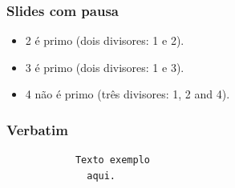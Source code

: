 \documentclass{beamer}
\begin{document}
	\begin{frame}
		\frametitle{Slides com pausa}
		\begin{itemize}
			\item 2 é primo (dois divisores: 1 e 2).
			\pause
			\item 3 é primo (dois divisores: 1 e 3).
			\pause
			\item 4 não é primo ({\color{red}três} divisores: 1, 2 and 4). 
		\end{itemize}
	\end{frame}
	
	\begin{frame}[fragile]
		\frametitle{Verbatim}
		\begin{verbatim}
			Texto exemplo
			  aqui.
		\end{verbatim}
	\end{frame}
	
\end{document}
